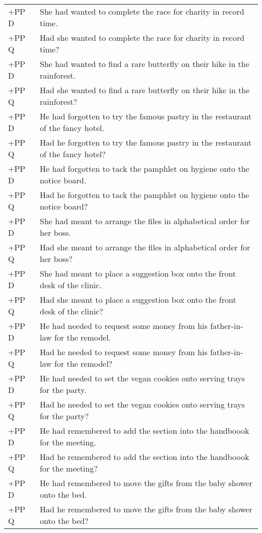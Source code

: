 \documentclass[11pt,oneside]{book}
\begin{document}
\begin{longtable}{ll}
\addlinespace
+PP D & She had wanted to complete the race for charity in record time.\\
+PP Q & Had she wanted to complete the race for charity in record time?\\
\addlinespace
+PP D & She had wanted to find a rare butterfly on their hike in the rainforest.\\
+PP Q & Had she wanted to find a rare butterfly on their hike in the rainforest?\\
\addlinespace
+PP D & He had forgotten to try the famous pastry in the restaurant of the fancy hotel.\\
+PP Q & Had he forgotten to try the famous pastry in the restaurant of the fancy hotel?\\
\addlinespace
+PP D & He had forgotten to tack the pamphlet on hygiene onto the notice board.\\
+PP Q & Had he forgotten to tack the pamphlet on hygiene onto the notice board?\\
\addlinespace
+PP D & She had meant to arrange the files in alphabetical order for her boss.\\
+PP Q & Had she meant to arrange the files in alphabetical order for her boss?\\
\addlinespace
+PP D & She had meant to place a suggestion box onto the front desk of the clinic.\\
+PP Q & Had she meant to place a suggestion box onto the front desk of the clinic?\\
\addlinespace
+PP D & He had needed to request some money from his father-in-law for the remodel.\\
+PP Q & Had he needed to request some money from his father-in-law for the remodel?\\
\addlinespace
+PP D & He had needed to set the vegan cookies onto serving trays for the party.\\
+PP Q & Had he needed to set the vegan cookies onto serving trays for the party?\\
\addlinespace
+PP D & He had remembered to add the section into the handboook for the meeting.\\
+PP Q & Had he remembered to add the section into the handboook for the meeting?\\
\addlinespace
+PP D & He had remembered to move the gifts from the baby shower onto the bed.\\
+PP Q & Had he remembered to move the gifts from the baby shower onto the bed?\\*
\end{longtable}
\end{document}
